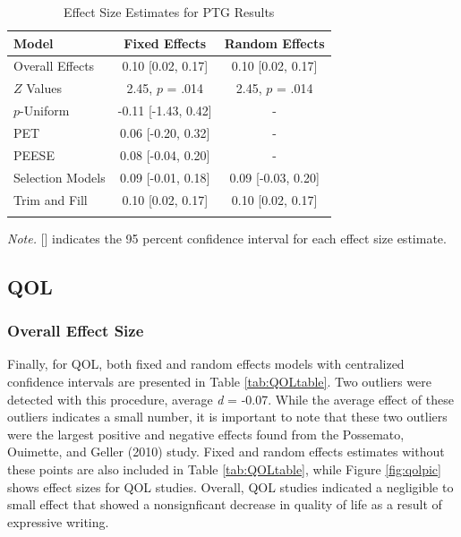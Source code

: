 \documentclass[english,man]{apa6}
\theoremstyle{definition}
\theoremstyle{definition}
\theoremstyle{definition}
\theoremstyle{remark}
\begin{document}
\begin{table}[tbp]
\begin{center}
\begin{threeparttable}
\caption{\label{tab:PTGtable}Effect Size Estimates for PTG Results}
\small{
\begin{tabular}{lcc}
\toprule
Model & Fixed Effects & Random Effects\\
\midrule
Overall Effects & 0.10 [0.02, 0.17] & 0.10 [0.02, 0.17]\\
$Z$ Values & 2.45, $p$ = .014 & 2.45, $p$ = .014\\
$p$-Uniform & -0.11 [-1.43, 0.42] & -\\
PET & 0.06 [-0.20, 0.32] & -\\
PEESE & 0.08 [-0.04, 0.20] & -\\
Selection Models & 0.09 [-0.01, 0.18] & 0.09 [-0.03, 0.20]\\
Trim and Fill & 0.10 [0.02, 0.17] & 0.10 [0.02, 0.17]\\
\bottomrule
\addlinespace
\end{tabular}
}
\begin{tablenotes}[para]
\textit{Note.} [] indicates the 95 percent confidence interval for each effect size estimate.
\end{tablenotes}
\end{threeparttable}
\end{center}
\end{table}

\subsection{QOL}\label{qol}

\subsubsection{Overall Effect Size}\label{overall-effect-size-2}

Finally, for QOL, both fixed and random effects models with centralized
confidence intervals are presented in Table \ref{tab:QOLtable}. Two
outliers were detected with this procedure, average \emph{d} = -0.07.
While the average effect of these outliers indicates a small number, it
is important to note that these two outliers were the largest positive
and negative effects found from the Possemato, Ouimette, and Geller
(2010) study. Fixed and random effects estimates without these points
are also included in Table \ref{tab:QOLtable}, while Figure
\ref{fig:qolpic} shows effect sizes for QOL studies. Overall, QOL
studies indicated a negligible to small effect that showed a
nonsignficant decrease in quality of life as a result of expressive
writing.
\end{document}
